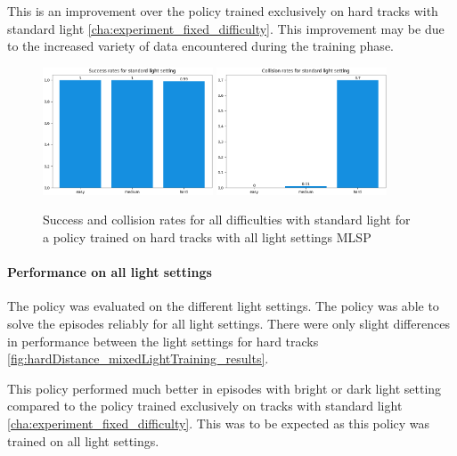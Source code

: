 This is an improvement over the policy trained exclusively on hard tracks with standard light \ref{cha:experiment_fixed_difficulty}.
This improvement may be due to the increased variety of data encountered during the training phase.

\begin{figure}
    \centering
    \includegraphics[width=0.45\textwidth]{Bilder/notebook_images/hardDistanceMixedLight_eval_standard_success_rates_barplot.png}
    \includegraphics[width=0.45\textwidth]{Bilder/notebook_images/hardDistanceMixedLight_eval_standard_collision_rates_barplot.png}
    \caption{Success and collision rates for all difficulties with standard light for a policy trained on hard tracks with all light settings \ac{MLSP}}
    \label{fig:hardDistance_mixedLight_generalization}
\end{figure}

\paragraph{Performance on all light settings}

The policy was evaluated on the different light settings. The policy was able to solve the episodes reliably for all light settings. There were only slight differences in performance between the light settings for hard tracks \ref{fig:hardDistance_mixedLightTraining_results}.


This policy performed much better in episodes with bright or dark light setting compared to the policy trained exclusively on tracks with standard light \ref{cha:experiment_fixed_difficulty}. This was to be expected as this policy was trained on all light settings.

